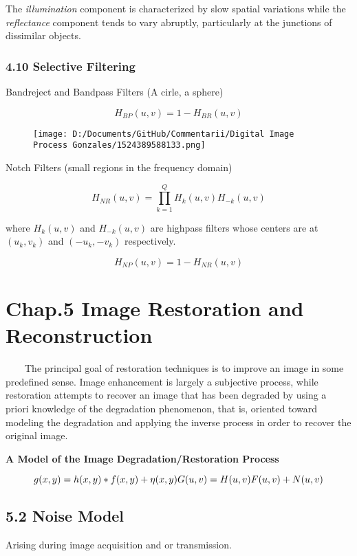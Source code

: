 \documentclass[]{article}
\begin{document}
The \emph{illumination} component is characterized by slow spatial
variations while the \emph{reflectance} component tends to vary
abruptly, particularly at the junctions of dissimilar objects.

\subsubsection{4.10 Selective Filtering}\label{header-n596}

Bandreject and Bandpass Filters (A cirle, a sphere)

\[H_{BP}(u,v)=1-H_{BR}(u,v)\]

\begin{figure}
\centering
\texttt{[image: D:/Documents/GitHub/Commentarii/Digital Image Process Gonzales/1524389588133.png]}
\caption{}
\end{figure}

Notch Filters (small regions in the frequency domain)

\[H_{NR}(u,v)=\prod\limits^{Q}_{k=1}H_k(u,v)H_{-k}(u,v)\]

where \(H_k(u,v)\) and \(H_{-k}(u,v)\) are highpass filters whose
centers are at \((u_k,v_k)\) and \((-u_k, -v_k)\) respectively.

\[H_{NP}(u,v)=1-H_{NR}(u,v)\]

\section{Chap.5 Image Restoration and Reconstruction}\label{header-n606}

\(\quad\quad\)The principal goal of restoration techniques is to improve
an image in some predefined sense. Image enhancement is largely a
subjective process, while restoration attempts to recover an image that
has been degraded by using a priori knowledge of the degradation
phenomenon, that is, oriented toward modeling the degradation and
applying the inverse process in order to recover the original image.

\textbf{A Model of the Image Degradation/Restoration Process}

\[g(x,y)=h(x,y)*f(x,y)+\eta(x,y)\\
G(u,v)=H(u,v)F(u,v)+N(u,v)\]

\subsection{5.2 Noise Model}\label{header-n612}

Arising during image acquisition and or transmission.
\end{document}
